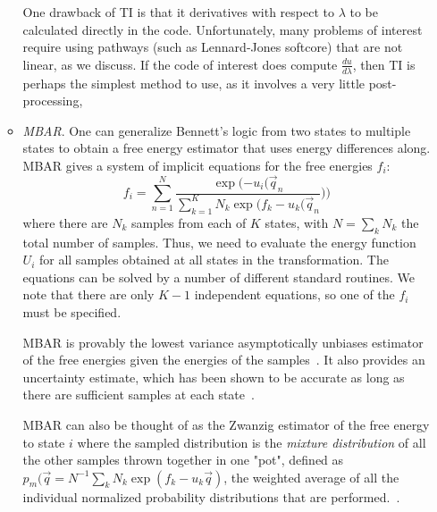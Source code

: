 \documentclass[9pt,bestpractices]{livecoms}
\begin{document}
\begin{enumerate}
\begin{itemize}
One drawback of TI is that it derivatives with respect to $\lambda$ to be calculated directly in the code. Unfortunately, many problems of interest
require using pathways (such as Lennard-Jones softcore) that are not linear, as we discuss.  If the code of interest does compute $\frac{du}{d\lambda}$, then TI is perhaps the simplest method to use, as it involves a very little post-processing,

\item \textit{MBAR}. One can generalize Bennett's logic from two states to multiple states to obtain a free energy estimator that uses energy differences along.  MBAR gives a system of implicit equations for the free energies $f_i$:
\begin{equation}
f_i = \sum_{n=1}^{N} \frac{\exp(-u_i(\vec{q}_n}{\sum_{k=1}^K N_k \exp(f_k-u_k(\vec{q}_n}))
\end{equation}
where there are $N_k$ samples from each of $K$ states, with $N=\sum_k N_k$ the total number of samples. Thus, we need to evaluate the energy function $U_i$ for all samples obtained at all states in the transformation. The equations can be solved by a number of different standard routines.  We note that there are only $K-1$ independent equations, so one of the $f_i$ must be specified.

MBAR is provably the lowest variance asymptotically unbiases estimator of the free energies given the energies of the samples~\cite{zqtan}. It also provides an uncertainty estimate, which has been shown to be accurate as long as there are sufficient samples at each state~\cite{paliwal:benchmark}.

MBAR can also be thought of as the Zwanzig estimator of the free energy to state $i$ where the sampled distribution is the \textit{mixture distribution} of all the other samples thrown together in one "pot", defined as $p_m(\vec{q} = N^{-1} \sum_k  N_k \exp(f_k-u_k\vec{q})$, the weighted average of all the individual normalized probability distributions that are performed.~\cite{shirts.prl}.

\end{itemize}



\end{enumerate}
\end{document}
